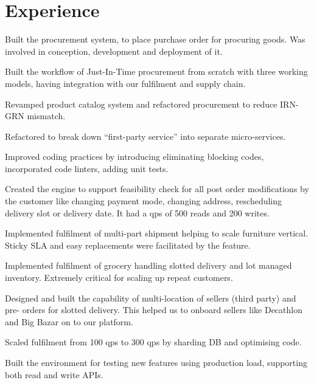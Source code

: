 \documentclass[]{deedy-resume-openfont}
\begin{document}
    
%
%
%
%
\section{Experience}
\hfill {}
\begin{tightemize}
	\item Built the procurement system, to place purchase order for procuring goods. Was involved in conception, development and deployment of it.
	\item Built the workflow of Just-In-Time procurement from scratch with three working models, having integration with our fulfilment and supply chain.
	\item Revamped product catalog system and refactored procurement to reduce IRN-GRN mismatch.
	\item Refactored to break down “first-party service” into separate micro-services.
	\item Improved coding practices by introducing eliminating blocking codes, incorporated code linters, adding unit tests.
\end{tightemize}
\sectionsep
{}\hfill {}
\begin{tightemize}
	\item Created the engine to support feasibility check for all post order modifications by the customer like changing payment mode, changing address, rescheduling delivery slot or delivery date. It had a qps of 500 reads and 200 writes.
	\item Implemented fulfilment of multi-part shipment helping to scale furniture vertical. Sticky SLA and easy replacements were facilitated by the feature.
	\item Implemented fulfilment of grocery handling slotted delivery and lot managed inventory. Extremely critical for scaling up repeat customers.
	\item Designed and built the capability of multi-location of sellers (third party) and pre- orders for slotted delivery. This helped us to onboard sellers like Decathlon and Big Bazar on to our platform.
	\item Scaled fulfilment from 100 qps to 300 qps by sharding DB and optimising code.
	\item Built the environment for testing new features using production load, supporting both read and write APIs.
\end{tightemize}
\end{document}
